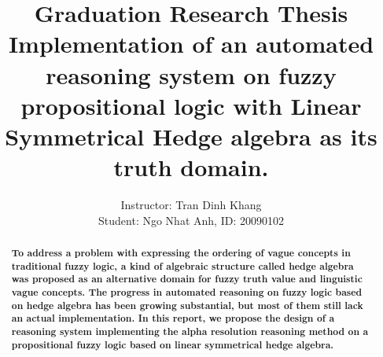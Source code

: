 \documentclass[12pt,fleqn,a4paper]{report}
\date{}
\begin{document}
\title{{\huge Graduation Research Thesis}\\
Implementation of an automated reasoning system on fuzzy propositional
logic with Linear
Symmetrical Hedge algebra as its truth domain.
}
\author{Instructor: Tran Dinh Khang\\Student: Ngo Nhat Anh, ID: 20090102}
\maketitle

%
%

\begin{abstract}
{\bfseries To address a problem with expressing the ordering
	of vague concepts in traditional fuzzy logic, a kind
	of algebraic structure called hedge algebra was
	proposed as an alternative domain for fuzzy truth
	value and linguistic vague concepts. The progress in
	automated reasoning on fuzzy logic based on hedge
	algebra has been growing substantial, but most of
	them still lack an actual implementation. In this
	report, we propose the design of a reasoning system implementing 
	the alpha resolution reasoning method
	on a propositional fuzzy logic based on linear
	symmetrical hedge algebra.
}
\end{abstract}

\renewcommand{\abstractname}{Tóm tắt nội dung đồ án}
\begin{abstract}
\end{abstract}
\tableofcontents



\end{document}
